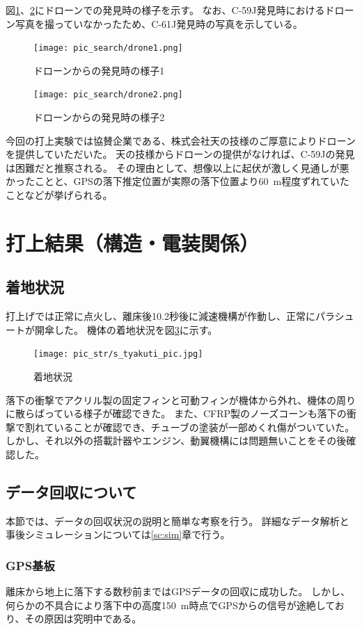 \documentclass[a4paper,11pt,uplatex]{jsarticle}
\begin{document}
図\ref{fig:drone1}、\ref{fig:drone2}にドローンでの発見時の様子を示す。
なお、C-59J発見時におけるドローン写真を撮っていなかったため、C-61J発見時の写真を示している。

\begin{figure}[H]
	\centering
	\texttt{[image: pic\_search/drone1.png]}
	\caption{ドローンからの発見時の様子1}
	\label{fig:drone1}
\end{figure}

\begin{figure}[H]
	\centering
	\texttt{[image: pic\_search/drone2.png]}
	\caption{ドローンからの発見時の様子2}
	\label{fig:drone2}
\end{figure}

今回の打上実験では協賛企業である、株式会社天の技様のご厚意によりドローンを提供していただいた。
天の技様からドローンの提供がなければ、C-59Jの発見は困難だと推察される。
その理由として、想像以上に起伏が激しく見通しが悪かったことと、GPSの落下推定位置が実際の落下位置より\SI{60}{m}程度ずれていたことなどが挙げられる。

\newpage
\section{打上結果（構造・電装関係）}
\subsection{着地状況}
打上げでは正常に点火し、離床後10.2秒後に減速機構が作動し、正常にパラシュートが開傘した。
機体の着地状況を図\ref{s_tyakuti_pic}に示す。

\begin{figure}[H]
	\centering
	\texttt{[image: pic\_str/s\_tyakuti\_pic.jpg]}
	\caption{着地状況}
	\label{s_tyakuti_pic}
\end{figure}

落下の衝撃でアクリル製の固定フィンと可動フィンが機体から外れ、機体の周りに散らばっている様子が確認できた。
また、CFRP製のノーズコーンも落下の衝撃で割れていることが確認でき、チューブの塗装が一部めくれ傷がついていた。
しかし、それ以外の搭載計器やエンジン、動翼機構には問題無いことをその後確認した。


\subsection{データ回収について}
本節では、データの回収状況の説明と簡単な考察を行う。
詳細なデータ解析と事後シミュレーションについては\ref{sc:sim}章で行う。
\subsubsection{GPS基板}
離床から地上に落下する数秒前まではGPSデータの回収に成功した。
しかし、何らかの不具合により落下中の高度\SI{150}{m}時点でGPSからの信号が途絶しており、その原因は究明中である。
\end{document}
